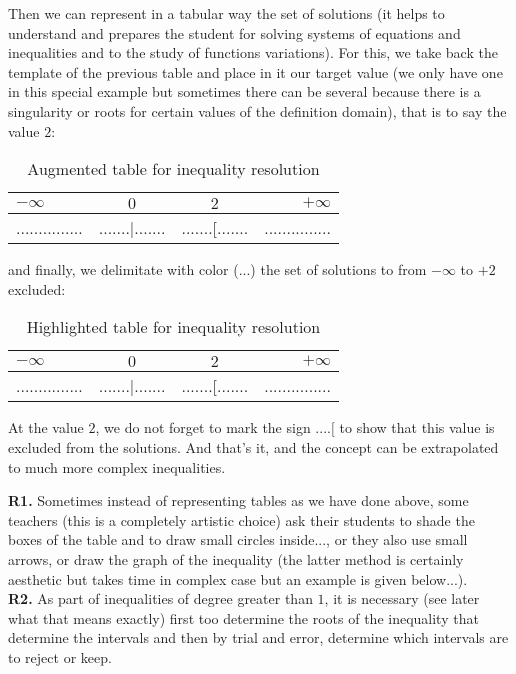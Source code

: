 \begin{tcolorbox}[colframe=black,colback=white,sharp corners]
	Then we can represent in a tabular way the set of solutions (it helps to understand and prepares the student for solving systems of equations and inequalities and to the study of functions variations). For this, we take back the template of the previous table and place in it our target value (we only have one in this special example but sometimes there can be several because there is a singularity or roots for certain values of the definition domain), that is to say the value $2$:
	\begin{table}[H]
		\begin{center}
		\begin{tabular}{|l|c|c|r|}
		\hline 
		{\cellcolor{black!30}$-\infty$} & {\cellcolor{black!30}$0$} & {\cellcolor{black!30}$2$} & {\cellcolor{black!30}$+\infty$}\\ 
		\hline 
		............... & .......|....... & .......[....... & ............... \\  
		\hline 
		\end{tabular} 
		\end{center}
		\caption{Augmented table for inequality resolution}
	\end{table}
	and finally, we delimitate with color (...) the set of solutions to from $-\infty$ to $+2$ excluded:
	\begin{table}[H]
		\begin{center}
		\begin{tabular}{|l|c|c|r|}
		\hline 
		{\cellcolor{black!30}$-\infty$} & {\cellcolor{black!30}$0$} & {\cellcolor{black!30}$2$} & {\cellcolor{black!30}$+\infty$}\\ 
		\hline 
		{\cellcolor{green!30}...............} & {\cellcolor{green!30}.......|.......}  & {\cellcolor{green!30}.......[.......} & ............... \\  
		\hline 
		\end{tabular} 
		\end{center}
		\caption{Highlighted table for inequality resolution}
	\end{table}
	At the value $2$, we do not forget to mark the sign $....[$ to show that this value is excluded from the solutions. And that's it, and the concept can be extrapolated to much more complex inequalities.
	\end{tcolorbox}
	\begin{tcolorbox}[title=Remarks,colframe=black,arc=10pt]
	\textbf{R1.} Sometimes instead of representing tables as we have done above, some teachers (this is a completely artistic choice) ask their students to shade the boxes of the table and to draw small circles inside..., or they also use small arrows, or draw the graph of the inequality (the latter method is certainly aesthetic but takes time in complex case but an example is given below...).\\
	
	\textbf{R2.} As part of inequalities of degree greater than $1$, it is necessary (see later what that means exactly) first too determine the roots of the inequality that determine the intervals and then by trial and error, determine which intervals are to reject or keep.
	\end{tcolorbox}

